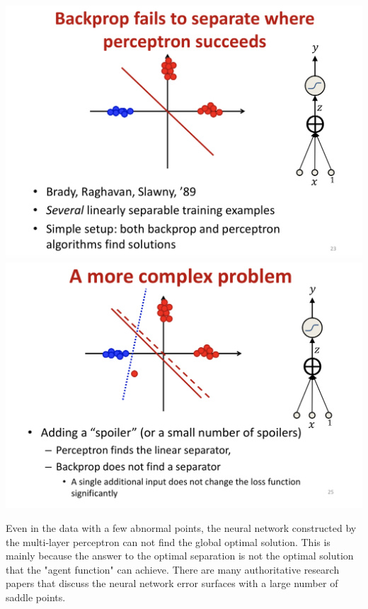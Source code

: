 \documentclass{article}
\begin{document}
	\includegraphics[scale=0.2]{66.png}
	\includegraphics[scale=0.2]{67.png}
	
	Even in the data with a few abnormal points, the neural network constructed by the multi-layer perceptron can not find the global optimal solution. This is mainly because the answer to the optimal separation is not the optimal solution that the "agent function" can achieve. There are many authoritative research papers that discuss the neural network error surfaces with a large number of saddle points.
	
\end{document}
